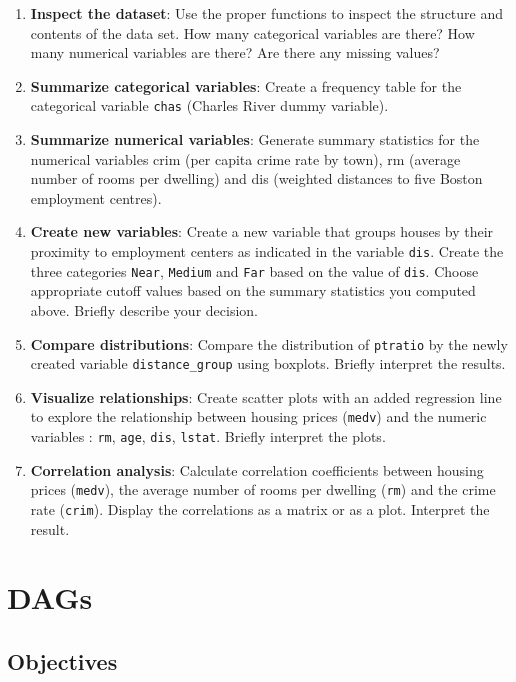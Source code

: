 \documentclass[
]{book}
\begin{document}
\begin{enumerate}
\def\labelenumi{\arabic{enumi}.}
\setcounter{enumi}{2}
\item
  \textbf{Inspect the dataset}: Use the proper functions to inspect the structure and contents of the data set. How many categorical variables are there? How many numerical variables are there? Are there any missing values?
\item
  \textbf{Summarize categorical variables}: Create a frequency table for the categorical variable \texttt{chas} (Charles River dummy variable).
\item
  \textbf{Summarize numerical variables}: Generate summary statistics for the numerical variables crim (per capita crime rate by town), rm (average number of rooms per dwelling) and dis (weighted distances to five Boston employment centres).
\item
  \textbf{Create new variables}: Create a new variable that groups houses by their proximity to employment centers as indicated in the variable \texttt{dis}. Create the three categories \texttt{Near}, \texttt{Medium} and \texttt{Far} based on the value of \texttt{dis}. Choose appropriate cutoff values based on the summary statistics you computed above. Briefly describe your decision.
\item
  \textbf{Compare distributions}: Compare the distribution of \texttt{ptratio} by the newly created variable \texttt{distance\_group} using boxplots. Briefly interpret the results.
\item
  \textbf{Visualize relationships}: Create scatter plots with an added regression line to explore the relationship between housing prices (\texttt{medv}) and the numeric variables : \texttt{rm}, \texttt{age}, \texttt{dis}, \texttt{lstat}. Briefly interpret the plots.
\item
  \textbf{Correlation analysis}: Calculate correlation coefficients between housing prices (\texttt{medv}), the average number of rooms per dwelling (\texttt{rm}) and the crime rate (\texttt{crim}). Display the correlations as a matrix or as a plot. Interpret the result.
\end{enumerate}

\hypertarget{dags-1}{%
\chapter{DAGs}\label{dags-1}}

\hypertarget{objectives-1}{%
\section{Objectives}\label{objectives-1}}
\end{document}
